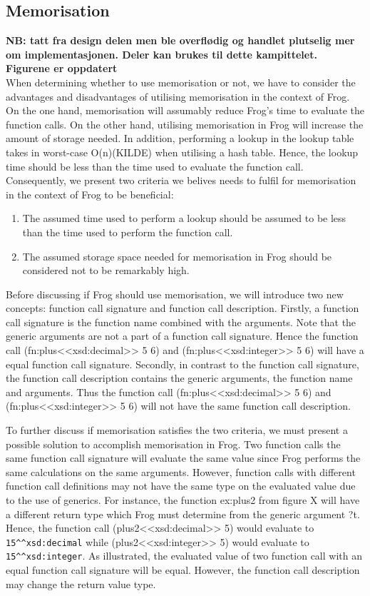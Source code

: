 \subsection{Memorisation}
\textbf{NB: tatt fra design delen men ble overflødig og handlet plutselig mer om implementasjonen. Deler kan brukes til dette kampittelet. Figurene er oppdatert}
\\
When determining whether to use memorisation or not, we have to consider the advantages and disadvantages of utilising memorisation in the context of Frog. On the one hand, memorisation will assumably reduce Frog's time to evaluate the function calls. On the other hand, utilising memorisation in Frog will increase the amount of storage needed. In addition, performing a lookup in the lookup table takes in worst-case O(n)(KILDE) when utilising a hash table. Hence, the lookup time should be less than the time used to evaluate the function call. Consequently, we present two criteria we belives needs to fulfil for memorisation in the context of Frog to be beneficial:
\begin{enumerate}
    \item The assumed time used to perform a lookup should be assumed to be less than the time used to perform the function call.
    \item The assumed storage space needed for memorisation in Frog should be considered not to be remarkably high. 
\end{enumerate}

\para 
Before discussing if Frog should use memorisation, we will introduce two new concepts: function call signature and function call description. 
Firstly, a function call signature is the function name combined with the arguments. Note that the generic arguments are not a part of a function call signature. Hence the function call (fn:plus<<xsd:decimal>> 5 6) and (fn:plus<<xsd:integer>> 5 6) will have a equal function call signature. Secondly, in contrast to the function call signature, the function call description contains the generic arguments, the function name and arguments. Thus the function call (fn:plus<<xsd:decimal>> 5 6) and (fn:plus<<xsd:integer>> 5 6) will not have the same function call description.

\para
To further discuss if memorisation satisfies the two criteria, we must present a possible solution to accomplish memorisation in Frog. Two function calls the same function call signature will evaluate the same value since Frog performs the same calculations on the same arguments. However, function calls with different function call definitions may not have the same type on the evaluated value due to the use of generics. For instance, the function ex:plus2 from figure X will have a different return type which Frog must determine from the generic argument ?t. Hence, the function call (plus2<<xsd:decimal>> 5)  would evaluate to \lstinline{15^^xsd:decimal} while (plus2<<xsd:integer>> 5) would evaluate to \lstinline{15^^xsd:integer}. As illustrated, the evaluated value of two function call with an equal function call signature will be equal. However, the function call description may change the return value type.

